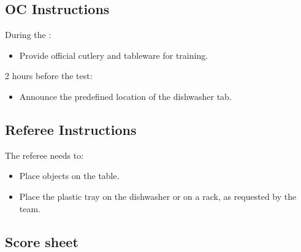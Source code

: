 \subsection*{OC Instructions}

During the \SetupDays:
\begin{itemize}
	\item Provide official cutlery and tableware for training.
\end{itemize}
2 hours before the test:
\begin{itemize}
	\item Announce the predefined location of the dishwasher tab.
\end{itemize}


\subsection*{Referee Instructions}

The referee needs to:
\begin{itemize}
	\item Place objects on the table.
	\item Place the plastic tray on the dishwasher or on a rack, as requested by the team.
\end{itemize}

\subsection*{Score sheet}


